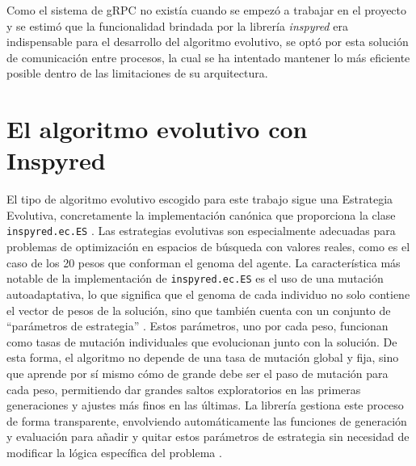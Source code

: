 Como el sistema de gRPC no existía cuando se empezó a trabajar en el proyecto y se estimó que la funcionalidad brindada por la librería \textit{inspyred} era indispensable para el desarrollo del algoritmo evolutivo, se optó por esta solución de comunicación entre procesos, la cual se ha intentado mantener lo más eficiente posible dentro de las limitaciones de su arquitectura.


\section{El algoritmo evolutivo con Inspyred} \label{sec:algoritmo_evolutivo_inspyred}

El tipo de algoritmo evolutivo escogido para este trabajo sigue una Estrategia Evolutiva, concretamente la implementación canónica que proporciona la clase \texttt{inspyred.ec.ES} \cite{aaron_garret_library_2025}. Las estrategias evolutivas son especialmente adecuadas para problemas de optimización en espacios de búsqueda con valores reales, como es el caso de los 20 pesos que conforman el genoma del agente. La característica más notable de la implementación de \texttt{inspyred.ec.ES} es el uso de una mutación autoadaptativa, lo que significa que el genoma de cada individuo no solo contiene el vector de pesos de la solución, sino que también cuenta con un conjunto de ``parámetros de estrategia'' \cite{aaron_garret_library_2025}. Estos parámetros, uno por cada peso, funcionan como tasas de mutación individuales que evolucionan junto con la solución. De esta forma, el algoritmo no depende de una tasa de mutación global y fija, sino que aprende por sí mismo cómo de grande debe ser el paso de mutación para cada peso, permitiendo dar grandes saltos exploratorios en las primeras generaciones y ajustes más finos en las últimas. La librería gestiona este proceso de forma transparente, envolviendo automáticamente las funciones de generación y evaluación para añadir y quitar estos parámetros de estrategia sin necesidad de modificar la lógica específica del problema \cite{aaron_garret_library_2025}.

